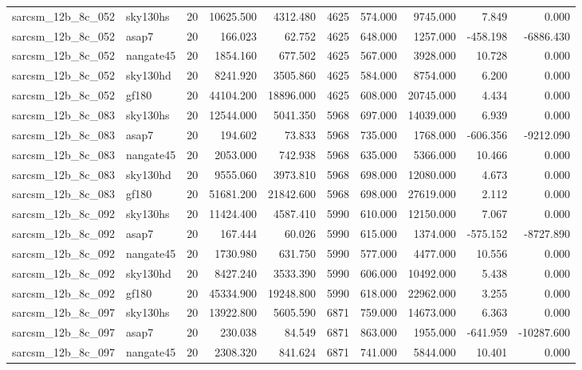 \begin{longtable}{llrrrrrrrr}
sarcsm\_12b\_8c\_052 & sky130hs & 20 & 10625.500 & 4312.480 & 4625 & 574.000 & 9745.000 & 7.849 & 0.000 \\
sarcsm\_12b\_8c\_052 & asap7 & 20 & 166.023 & 62.752 & 4625 & 648.000 & 1257.000 & -458.198 & -6886.430 \\
sarcsm\_12b\_8c\_052 & nangate45 & 20 & 1854.160 & 677.502 & 4625 & 567.000 & 3928.000 & 10.728 & 0.000 \\
sarcsm\_12b\_8c\_052 & sky130hd & 20 & 8241.920 & 3505.860 & 4625 & 584.000 & 8754.000 & 6.200 & 0.000 \\
sarcsm\_12b\_8c\_052 & gf180 & 20 & 44104.200 & 18896.000 & 4625 & 608.000 & 20745.000 & 4.434 & 0.000 \\
sarcsm\_12b\_8c\_083 & sky130hs & 20 & 12544.000 & 5041.350 & 5968 & 697.000 & 14039.000 & 6.939 & 0.000 \\
sarcsm\_12b\_8c\_083 & asap7 & 20 & 194.602 & 73.833 & 5968 & 735.000 & 1768.000 & -606.356 & -9212.090 \\
sarcsm\_12b\_8c\_083 & nangate45 & 20 & 2053.000 & 742.938 & 5968 & 635.000 & 5366.000 & 10.466 & 0.000 \\
sarcsm\_12b\_8c\_083 & sky130hd & 20 & 9555.060 & 3973.810 & 5968 & 698.000 & 12080.000 & 4.673 & 0.000 \\
sarcsm\_12b\_8c\_083 & gf180 & 20 & 51681.200 & 21842.600 & 5968 & 698.000 & 27619.000 & 2.112 & 0.000 \\
sarcsm\_12b\_8c\_092 & sky130hs & 20 & 11424.400 & 4587.410 & 5990 & 610.000 & 12150.000 & 7.067 & 0.000 \\
sarcsm\_12b\_8c\_092 & asap7 & 20 & 167.444 & 60.026 & 5990 & 615.000 & 1374.000 & -575.152 & -8727.890 \\
sarcsm\_12b\_8c\_092 & nangate45 & 20 & 1730.980 & 631.750 & 5990 & 577.000 & 4477.000 & 10.556 & 0.000 \\
sarcsm\_12b\_8c\_092 & sky130hd & 20 & 8427.240 & 3533.390 & 5990 & 606.000 & 10492.000 & 5.438 & 0.000 \\
sarcsm\_12b\_8c\_092 & gf180 & 20 & 45334.900 & 19248.800 & 5990 & 618.000 & 22962.000 & 3.255 & 0.000 \\
sarcsm\_12b\_8c\_097 & sky130hs & 20 & 13922.800 & 5605.590 & 6871 & 759.000 & 14673.000 & 6.363 & 0.000 \\
sarcsm\_12b\_8c\_097 & asap7 & 20 & 230.038 & 84.549 & 6871 & 863.000 & 1955.000 & -641.959 & -10287.600 \\
sarcsm\_12b\_8c\_097 & nangate45 & 20 & 2308.320 & 841.624 & 6871 & 741.000 & 5844.000 & 10.401 & 0.000 \\

\end{longtable}
